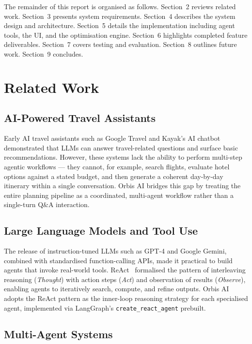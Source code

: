\documentclass[12pt, a4paper]{article}
\begin{document}
The remainder of this report is organised as follows. Section~2 reviews related work. Section~3 presents system requirements. Section~4 describes the system design and architecture. Section~5 details the implementation including agent tools, the UI, and the optimisation engine. Section~6 highlights completed feature deliverables. Section~7 covers testing and evaluation. Section~8 outlines future work. Section~9 concludes.

\section{Related Work}

\subsection{AI-Powered Travel Assistants}

Early AI travel assistants such as Google Travel and Kayak's AI chatbot demonstrated that LLMs can answer travel-related questions and surface basic recommendations. However, these systems lack the ability to perform multi-step agentic workflows --- they cannot, for example, search flights, evaluate hotel options against a stated budget, and then generate a coherent day-by-day itinerary within a single conversation. Orbis AI bridges this gap by treating the entire planning pipeline as a coordinated, multi-agent workflow rather than a single-turn Q\&A interaction.

\subsection{Large Language Models and Tool Use}

The release of instruction-tuned LLMs such as GPT-4 and Google Gemini, combined with standardised function-calling APIs, made it practical to build agents that invoke real-world tools. ReAct~\cite{yao2022react} formalised the pattern of interleaving reasoning (\textit{Thought}) with action steps (\textit{Act}) and observation of results (\textit{Observe}), enabling agents to iteratively search, compute, and refine outputs. Orbis AI adopts the ReAct pattern as the inner-loop reasoning strategy for each specialised agent, implemented via LangGraph's \texttt{create\_react\_agent} prebuilt.

\subsection{Multi-Agent Systems}
\end{document}
